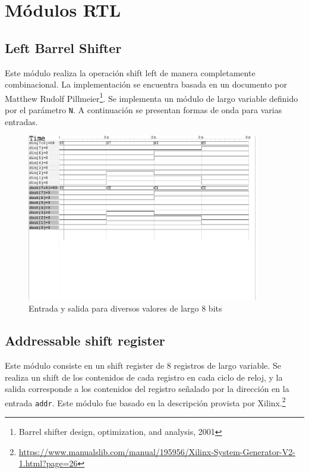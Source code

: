 \documentclass[letterpaper, 12pt]{article}
\numberwithin{equation}{section}
\begin{document}
\section{Módulos RTL}

\subsection{Left Barrel Shifter}

Este módulo realiza la operación shift left de manera completamente combinacional. La implementación se encuentra basada en un documento por Matthew Rudolf Pillmeier\footnote{Barrel shifter design, optimization, and analysis, 2001}. Se implementa un módulo de largo variable definido por el parámetro \texttt{N}. A continuación se presentan formas de onda para varias entradas.

\begin{figure}[H]
  \centering
  \includegraphics[width=0.9\textwidth]{../testbench/lbshifter/waves_lbshifter.pdf}
  \caption{Entrada y salida para diversos valores de largo 8 bits}
\end{figure}

\subsection{Addressable shift register}

Este módulo consiste en un shift register de 8 registros de largo variable. Se realiza un shift de los contenidos de cada registro en cada ciclo de reloj, y la salida corresponde a los contenidos del registro señalado por la dirección en la entrada \texttt{addr}. Este módulo fue basado en la descripción provista por Xilinx.\footnote{\url{https://www.manualslib.com/manual/195956/Xilinx-System-Generator-V2-1.html?page=26}}
\end{document}
